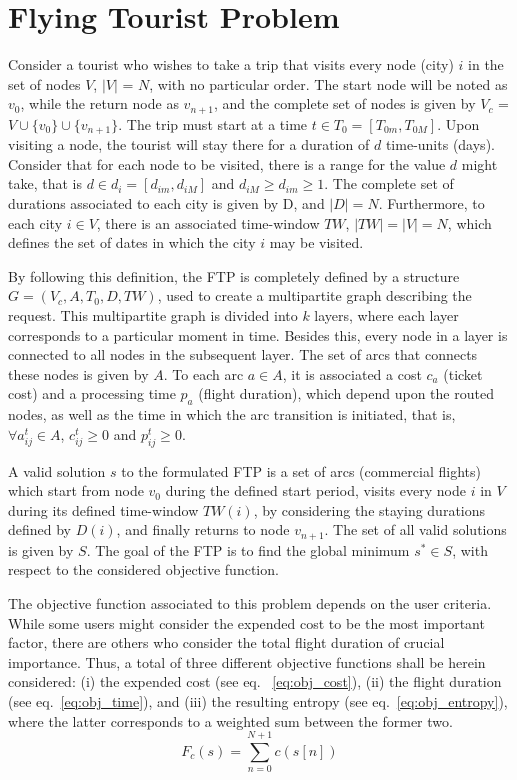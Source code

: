 \cleardoublepage

\section{Flying Tourist Problem}
\label{sec:ftp}


Consider a tourist who wishes to take a trip that visits every node (city) $i$
in the set of nodes $V$, $|V|$ = $N$, with no particular order. The start node
will be noted as $v_{0}$, while the return node as $v_{n+1}$, and the complete
set of nodes is given by $V_c$ = $V \cup \{v_0\} \cup \{v_{n+1}\}$. The trip
must start at a time $t \in T_0 = [T_{0m}, T_{0M}]$. Upon visiting a node, the
tourist will stay there for a duration of $d$ time-units (days). Consider that
for each node to be visited, there is a range for the value $d$ might take, that
is $d \in d_i = [d_{im}, d_{iM}]$ and $d_{iM} \geq d_{im} \geq 1$. The complete
set of durations associated to each city is given by D, and $|D| = N$.
Furthermore, to each city $i \in V$, there is an associated time-window $TW$,
$|TW| = |V| = N$, which defines the set of dates in which the city $i$ may be
visited.

By following this definition, the FTP is completely defined by a structure $G =
(V_c, A, T_{0}, D, TW)$, used to create a multipartite graph describing the
request. This multipartite graph is divided into $k$ layers, where each layer
corresponds to a particular moment in time. Besides this, every node in a layer
is connected to all nodes in the subsequent layer. The set of arcs that connects
these nodes is given by $A$. To each arc $a \in A$, it is associated a cost
$c_{a}$ (ticket cost) and a processing time $p_{a}$ (flight duration), which
depend upon the routed nodes, as well as the time in which the arc transition is
initiated, that is, $\forall a_{ij}^{t} \in A$, $c_{ij}^{t} \geq 0$ and
$p_{ij}^{t} \geq 0$.

A valid solution $s$ to the formulated FTP is a set of arcs (commercial flights)
which start from node $v_0$ during the defined start period, visits every node
$i$ in $V$ during its defined time-window $TW(i)$, by considering the staying
durations defined by $D(i)$, and finally returns to node $v_{n+1}$. The set of
all valid solutions is given by $S$. The goal of the FTP is to find the global
minimum $s^* \in S$, with respect to the considered objective function.

The objective function associated to this problem depends on the user criteria.
While some users might consider the expended cost to be the most important
factor, there are others who consider the total flight duration of crucial
importance. Thus, a total of three different objective functions shall be herein
considered: (i) the expended cost (see eq. ~\ref{eq:obj_cost}), (ii) the flight
duration (see eq.~\ref{eq:obj_time}), and (iii) the resulting entropy (see
eq.~\ref{eq:obj_entropy}), where the latter corresponds to a weighted sum
between the former two. 
\begin{equation}
\label{eq:obj_cost}
  F_{c}(s) = \sum_{n=0}^{N+1} c(s[n])
\end{equation}

